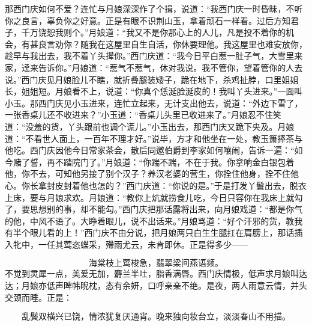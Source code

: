 那西门庆如何不爱？连忙与月娘深深作了个揖，说道：“我西门庆一时昏昧，不听你之良言，辜负你之好意。正是有眼不识荆山玉，拿着顽石一样看。过后方知君子，千万饶恕我则个。”月娘道：“我又不是你那心上的人儿，凡是投不着你的机会，有甚良言劝你？随我在这屋里自生自活，你休要理他。我这屋里也难安放你，趁早与我出去，我不着丫头撵你。”西门庆道：“我今日平白惹一肚子气，大雪里来家，迳来告诉你。”月娘道：“惹气不惹气，休对我说。我不管你，望着管你的人去说。”西门庆见月娘脸儿不瞧，就折叠腿装矮子，跪在地下，杀鸡扯脖，口里姐姐长，姐姐短。月娘看不上，说道：“你真个恁涎脸涎皮的！我叫丫头进来。”一面叫小玉。那西门庆见小玉进来，连忙立起来，无计支出他去，说道：“外边下雪了，一张香桌儿还不收进来？”小玉道：“香桌儿头里已收进来了。”月娘忍不住笑道：“没羞的货，丫头跟前也调个谎儿。”小玉出去，那西门庆又跪下央及。月娘道：“不看世人面上，一百年不理才好。”说毕，方才和他坐在一处，教玉箫捧茶与他吃。西门庆因他今日常家茶会，散后同邀伯爵到李家如何嚷闹，告诉一遍：“如今赌了誓，再不踏院门了。”月娘道：“你踹不踹，不在于我。你拿响金白银包着他，你不去，可知他另接了别个汉子？养汉老婆的营生，你拴住他身，拴不住他心。你长拿封皮封着他也怎的？”西门庆道：“你说的是。”于是打发丫鬟出去，脱衣上床，要与月娘求欢。月娘道：“教你上炕就捞食儿吃，今日只容你在我床上就勾了，要思想别的事，却不能勾。”西门庆把那话露将出来，向月娘戏道：“都是你气的他，中风不语了。大睁着眼儿，说不出话来。”月娘骂道：“好个汗邪的货，教我有半个眼儿看的上！”西门庆不由分说，把月娘两只白生生腿扛在肩膀上，那话插入牝中，一任其莺恣蝶采，殢雨尤云，未肯即休。正是得多少——

\[
海棠枝上莺梭急，翡翠梁间燕语频。
\]
不觉到灵犀一点，美爱无加，麝兰半吐，脂香满唇。西门庆情极，低声求月娘叫达达；月娘亦低声睥帏睨枕，态有余妍，口呼亲亲不绝。是夜，两人雨意云情，并头交颈而睡。正是：

\[
乱鬓双横兴已饶，情浓犹复厌通宵。
晚来独向妆台立，淡淡春山不用描。
\]

